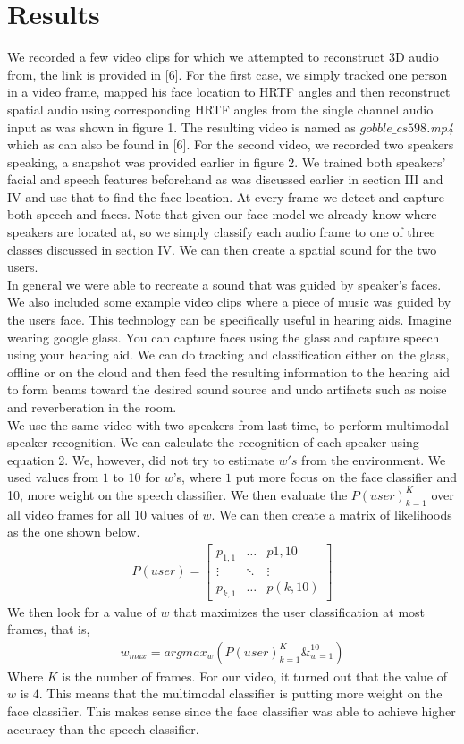 \documentclass{article}
\begin{document}
\section{Results} 
We recorded a few video clips for which we attempted to reconstruct 3D audio from, the link is provided in [6]. For the first case, we simply tracked one person in a video frame, mapped his face location to HRTF angles and then reconstruct spatial audio using corresponding HRTF angles from the single channel audio input as was shown in figure 1. The resulting video is named as {\it $gobble\_cs598$.mp4} which as can also be found in [6]. For the second video, we recorded two speakers speaking, a snapshot was provided earlier in figure 2. We trained both speakers' facial and speech features beforehand as was discussed earlier in section III and IV and use that to find the face location. At every frame we detect and capture both speech and faces. Note that given our face model we already know where speakers are located at, so we simply classify each audio frame to one of three classes discussed in section IV. We can then create a spatial sound for the two users. \\ In general we were able to recreate a sound that was guided by speaker’s faces. We also included some example video clips where a piece of music was guided by the users face. This technology can be specifically useful in hearing aids. Imagine wearing google glass. You can capture faces using the glass and capture speech using your hearing aid. We can do tracking and classification either on the glass, offline or on the cloud and then feed the resulting information to the hearing aid to form beams toward the desired sound source and undo artifacts such as noise and reverberation in the room. \\ 
We use the same video with two speakers from last time, to perform multimodal speaker recognition. We can calculate the recognition of each speaker using equation 2. We, however, did not try to estimate $w's$ from the environment. We used values from $1$ to $10$ for $w$'s, where $1$ put more focus on the face classifier and 10, more weight on the speech classifier. We then evaluate the $P(user)_{k=1}^K$ over all video frames for all 10 values of $w$. We can then create a matrix of likelihoods as the one shown below.
\begin{align}P(user) = \begin{bmatrix}
p_{1,1}&\dots& p{1,10}\\
\vdots &\ddots &\vdots\\
p_{k,1}&\dots&p(k,10)
\end{bmatrix}\end{align}
We then look for a value of $w$ that maximizes the user classification at most frames, that is, 
\begin{align}
w_{max} = argmax_w(P(user)_{k=1}^K \&_ {w=1}^{10})
\end{align}
Where $K$ is the number of frames. 
For our video, it turned out that the value of $w$ is $4$. This means that the multimodal classifier is putting more weight on the face classifier. This makes sense since the face classifier was able to achieve higher accuracy than the speech classifier. 
\end{document}
